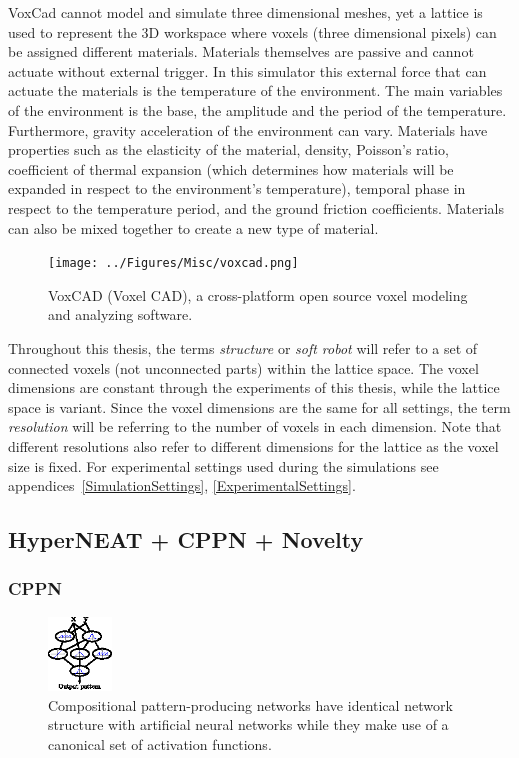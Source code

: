 \documentclass{sig-alternate}
\begin{document}
VoxCad cannot model and simulate three dimensional meshes, yet a lattice is used to represent the 3D workspace where voxels (three dimensional pixels) can be assigned different materials. Materials themselves are passive and cannot actuate without external trigger. In this simulator this external force that can actuate the materials is the temperature of the environment. The main variables of the environment is the base, the amplitude and the period of the temperature. Furthermore, gravity acceleration of the environment can vary. Materials have properties such as the elasticity of the material, density, Poisson's ratio, coefficient of thermal expansion (which determines how materials will be expanded in respect to the environment's temperature), temporal phase in respect to the temperature period, and the ground friction coefficients. Materials can also be mixed together to create a new type of material.

\begin{figure}[t!]
\centering
\texttt{[image: ../Figures/Misc/voxcad.png]}
\caption{VoxCAD (Voxel CAD), a cross-platform open source voxel modeling and analyzing software.}
\label{fig:VoxCAD}
\end{figure}

Throughout this thesis, the terms \textit{structure} or \textit{soft robot} will refer to a set of connected voxels (not unconnected parts) within the lattice space. The voxel dimensions are constant through the experiments of this thesis, while the lattice space is variant. Since the voxel dimensions are the same for all settings, the term \textit{resolution} will be referring to the number of voxels in each dimension. Note that different resolutions also refer to different dimensions for the lattice as the voxel size is fixed.  For experimental settings used during the simulations see appendices~\ref{SimulationSettings}, \ref{ExperimentalSettings}. 

\subsection{HyperNEAT + CPPN + Novelty}


\subsubsection{CPPN}
\begin{figure}[t!]
\centering
\includegraphics[width=0.15\textwidth]{../Figures/Misc/cppnNetwork.eps}
\caption{Compositional pattern-producing networks have identical network structure with artificial neural networks while they make use of a canonical set of activation functions.}
\label{fig:cppnNetwork}
\end{figure}
\end{document}
